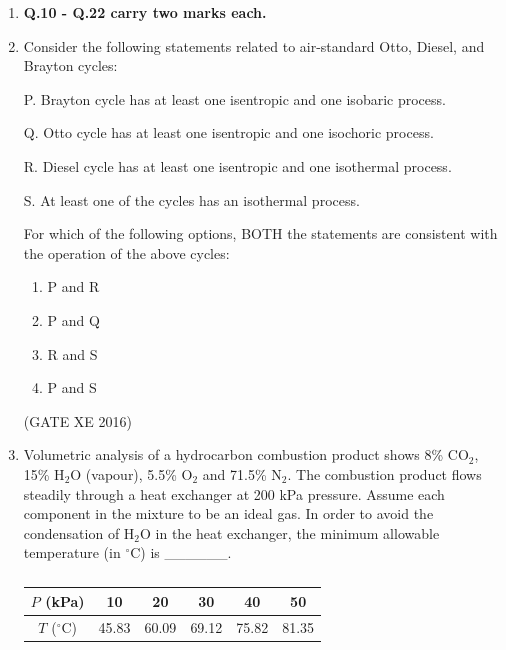 \documentclass[12pt]{article}
\begin{document}
\begin{enumerate}
\begin{multicols}{4}
\begin{enumerate}
\item P and R
\item P and Q
\item R and S
\item Q and S
\end{enumerate}
\end{multicols}

(GATE XE 2016)

\item[] \textbf{Q.10 - Q.22 carry two marks each.}

\item Consider the following statements related to air-standard Otto, Diesel, and Brayton cycles:

P. Brayton cycle has at least one isentropic and one isobaric process.  

Q. Otto cycle has at least one isentropic and one isochoric process.  

R. Diesel cycle has at least one isentropic and one isothermal process.  

S. At least one of the cycles has an isothermal process.  

For which of the following options, BOTH the statements are consistent with the operation of the above cycles:

\begin{multicols}{4}
\begin{enumerate}
\item P and R
\item P and Q
\item R and S
\item P and S
\end{enumerate}
\end{multicols}

(GATE XE 2016)

\item Volumetric analysis of a hydrocarbon combustion product shows 8\% CO$_2$, 15\% H$_2$O (vapour), 5.5\% O$_2$ and 71.5\% N$_2$. The combustion product flows steadily through a heat exchanger at 200 kPa pressure. Assume each component in the mixture to be an ideal gas. In order to avoid the condensation of H$_2$O in the heat exchanger, the minimum allowable temperature (in $^\circ$C) is \_\_\_\_\_\_. 


\begin{table}[H]
\centering
\caption{}
\label{}
\begin{tabular}{|c|c|c|c|c|c|}
\hline
$P$ (kPa) & 10 & 20 & 30 & 40 & 50 \\
\hline
$T$ ($^\circ$C) & 45.83 & 60.09 & 69.12 & 75.82 & 81.35 \\
\hline
\end{tabular}
\end{table}


\end{enumerate}
\end{document}
